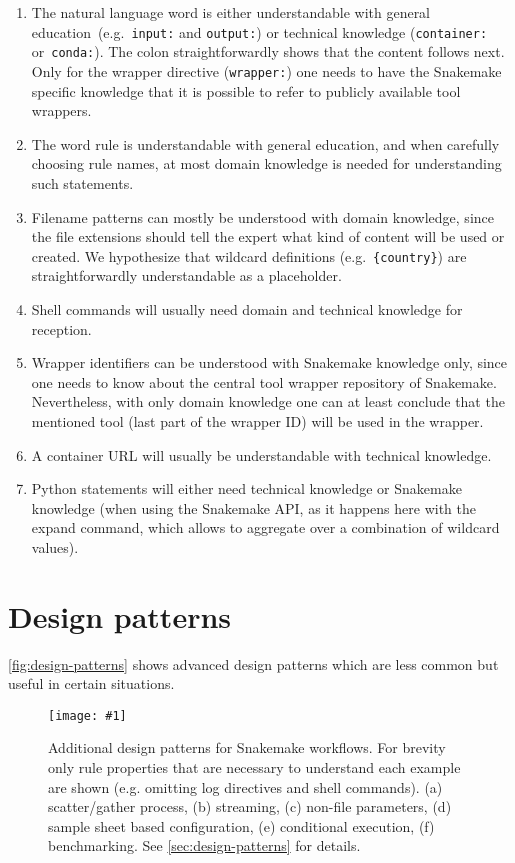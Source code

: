 \documentclass{scrartcl}
\newcommand{\image}[1]{\centering\texttt{[image: \#1]}}
\begin{document}
\begin{enumerate}
	\item The natural language word is either understandable with general education~(e.g.\ \lstinline!input:! and \lstinline!output:!) or technical knowledge (\lstinline!container:! or~\lstinline!conda:!).
	      The colon straightforwardly shows that the content follows next.
	      Only for the wrapper directive (\lstinline!wrapper:!) one needs to have the Snakemake specific knowledge that it is possible to refer to publicly available tool wrappers.
	\item
	      The word rule is understandable with general education, and when
	      carefully choosing rule names, at most domain knowledge is needed for
	      understanding such statements.
	\item
	      Filename patterns can mostly be understood with domain knowledge,
	      since the file extensions should tell the expert what kind of content
	      will be used or created.
	      We hypothesize that wildcard definitions (e.g.~\lstinline!{country}!) are straightforwardly understandable as a placeholder.
	\item
	      Shell commands will usually need domain and technical knowledge for
	      reception.
	\item
	      Wrapper identifiers can be understood with Snakemake knowledge only,
	      since one needs to know about the central tool wrapper repository of
	      Snakemake.
	      Nevertheless, with only domain knowledge one can at least conclude that the mentioned tool (last part of the wrapper ID) will be used in the wrapper.
	\item
	      A container URL will usually be understandable with technical
	      knowledge.
	\item
	      Python statements will either need technical knowledge or Snakemake
	      knowledge (when using the Snakemake API, as it happens here with the
	      expand command, which allows to aggregate over a combination of
	      wildcard values).
\end{enumerate}

\section{Design patterns}\label{sec:design-patterns}

\autoref{fig:design-patterns} shows advanced design patterns which are less common but useful in certain situations.

\begin{figure}
\image{design-patterns.pdf}
\caption{Additional design patterns for Snakemake workflows. For brevity only rule properties that are necessary to understand each example are shown (e.g. omitting log directives and shell commands). (a) scatter/gather process, (b) streaming, (c) non-file parameters, (d) sample sheet based configuration, (e) conditional execution, (f) benchmarking. See \autoref{sec:design-patterns} for details.}\label{fig:design-patterns}
\end{figure}
\end{document}
